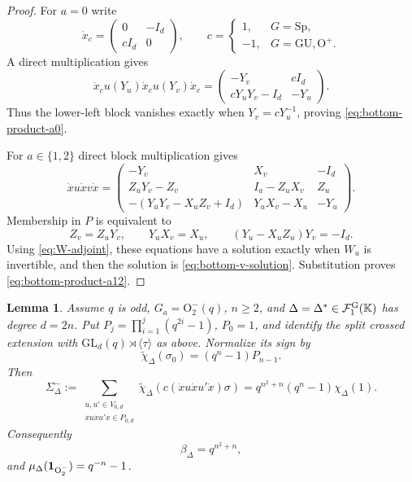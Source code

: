 \documentclass[12pt]{amsart}
\numberwithin{itemcounter}{subsection}
\theoremstyle{plain}
\newtheorem{lemma}[theorem]{Lemma}
\theoremstyle{definition}
\theoremstyle{remark}
\numberwithin{equation}{section}
\def\bbK{\mathbb{K}}
\def\calF{\mathcal{F}}
\def\O{\mathrm{O}}
\def\Sp{\mathrm{Sp}}
\def\GL{\mathrm{GL}}
\def\GU{\mathrm{GU}}
\begin{document}
\begin{proof}
For $a=0$ write
\[
\dot{x}_c=\begin{pmatrix}0&-I_d\\cI_d&0\end{pmatrix},
\qquad
c=\begin{cases}1,&G=\Sp,\\-1,&G=\GU,\O^+.
\end{cases}
\]
A direct multiplication gives
\[
\dot{x}_cu(Y_u)\dot{x}_cu(Y_v)\dot{x}_c
=
\begin{pmatrix}
-Y_v&cI_d\\
cY_uY_v-I_d&-Y_u
\end{pmatrix}.
\]
Thus the lower-left block vanishes exactly when
$Y_v=cY_u^{-1}$, proving \eqref{eq:bottom-product-a0}.

For $a\in\{1,2\}$ direct block multiplication gives
\[
\dot{x}u\dot{x}v\dot{x}
=
\begin{pmatrix}
-Y_v&X_v&-I_d\\
Z_uY_v-Z_v&I_a-Z_uX_v&Z_u\\
-(Y_uY_v-X_uZ_v+I_d)&Y_uX_v-X_u&-Y_u
\end{pmatrix}.
\]
Membership in $P$ is equivalent to
\[
Z_v=Z_uY_v,
\qquad
Y_uX_v=X_u,
\qquad
(Y_u-X_uZ_u)Y_v=-I_d.
\]
Using \eqref{eq:W-adjoint}, these equations have a solution exactly when
$W_u$ is invertible, and then the solution is
\eqref{eq:bottom-v-solution}.  Substitution proves
\eqref{eq:bottom-product-a12}.
\end{proof}

\begin{lemma}\label{lem:Ominus-rank-two-sum}
Assume \(q\) is odd, \(G_a=\O^-_2(q)\), \(n\ge2\), and
\(\Delta=\Delta^*\in\calF_1^{\rm G}(\bbK)\) has degree \(d=2n\).  Put
\(P_j=\prod_{i=1}^j(q^{2i}-1)\), \(P_0=1\), and identify the split crossed
extension with \(\GL_d(q)\rtimes\langle\tau\rangle\) as above.  Normalize
its sign by
\begin{equation}\label{eq:Ominus-extension-normalization}
 \widetilde\chi_\Delta(\sigma_0)=(q^n-1)P_{n-1}.
\end{equation}
Then
\begin{equation}\label{eq:Ominus-total-sum}
\Sigma_\Delta^-:=
\sum_{\substack{u,u'\in V_{0,d}\\
\dot{x}u\dot{x}u'\dot{x}\in P_{0,d}}}
\widetilde\chi_\Delta\!\left(
 c(\dot{x}u\dot{x}u'\dot{x})\sigma\right)
=q^{n^2+n}(q^n-1)\chi_\Delta(1).
\end{equation}
Consequently
\begin{equation}\label{eq:beta-Ominus-sign}
 \beta_\Delta=q^{n^2+n},
\end{equation}
and \(\mu_\Delta({\bf1}_{\O^-_2})=q^{-n}-1\).
\end{lemma}
\end{document}
